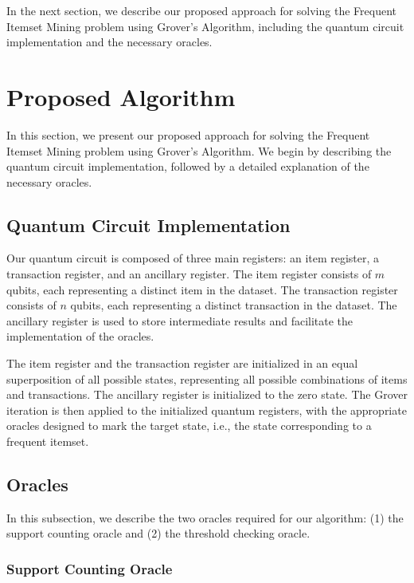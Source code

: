 In the next section, we describe our proposed approach for solving the Frequent Itemset Mining problem using Grover's Algorithm, including the quantum circuit implementation and the necessary oracles.

\section{Proposed Algorithm}
\label{sec:algorithm}

In this section, we present our proposed approach for solving the Frequent Itemset Mining problem using Grover's Algorithm. We begin by describing the quantum circuit implementation, followed by a detailed explanation of the necessary oracles.

\subsection{Quantum Circuit Implementation}
\label{subsec:circuit}

Our quantum circuit is composed of three main registers: an item register, a transaction register, and an ancillary register. The item register consists of $m$ qubits, each representing a distinct item in the dataset. The transaction register consists of $n$ qubits, each representing a distinct transaction in the dataset. The ancillary register is used to store intermediate results and facilitate the implementation of the oracles.

The item register and the transaction register are initialized in an equal superposition of all possible states, representing all possible combinations of items and transactions. The ancillary register is initialized to the zero state. The Grover iteration is then applied to the initialized quantum registers, with the appropriate oracles designed to mark the target state, i.e., the state corresponding to a frequent itemset.

\subsection{Oracles}
\label{subsec:oracles}

In this subsection, we describe the two oracles required for our algorithm: (1) the support counting oracle and (2) the threshold checking oracle.

\subsubsection{Support Counting Oracle}
\label{subsubsec:support_counting}

